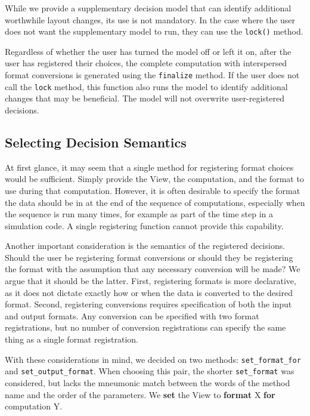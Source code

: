 \documentclass[sigconf,review=true]{acmart}
\begin{document}
While we provide a supplementary decision model that can identify additional worthwhile layout changes, its use is not mandatory.
In the case where the user does not want the supplementary model to run, they can use the \verb.lock(). method. 

Regardless of whether the user has turned the model off or left it on, 
after the user has registered their choices, the complete computation with interspersed format conversions is generated using the \verb.finalize. method.
If the user does not call the \verb.lock. method, this function also runs the model to identify additional changes that may be beneficial. The model will not overwrite user-registered decisions.

\subsection{Selecting Decision Semantics}

At first glance, it may seem that a single method for registering format choices would be sufficient. 
Simply provide the View, the computation, and the format to use during that computation.
However, it is often desirable to specify the format the data should be in at the end of the sequence of computations, especially when the sequence is run many times, for example as part of the time step in a simulation code.
A single registering function cannot provide this capability. 

Another important consideration is the semantics of the registered decisions. 
Should the user be registering format conversions or should they be registering the format with the assumption that any necessary conversion will be made?
We argue that it should be the latter.
First, registering formats is more declarative, as it does not dictate exactly how or when the data is converted to the desired format.
Second, registering conversions requires specification of both the input and output formats. 
Any conversion can be specified with two format registrations, but no number of conversion registrations can specify the same thing as a single format registration.

With these considerations in mind, we decided on two methods: \verb.set_format_for. and \verb.set_output_format..
When choosing this pair, the shorter \verb.set_format. was considered, but lacks the mneumonic match between the words of the method name and the order of the parameters. We \textbf{set} the View to \textbf{format} X \textbf{for} computation Y. 
\end{document}
